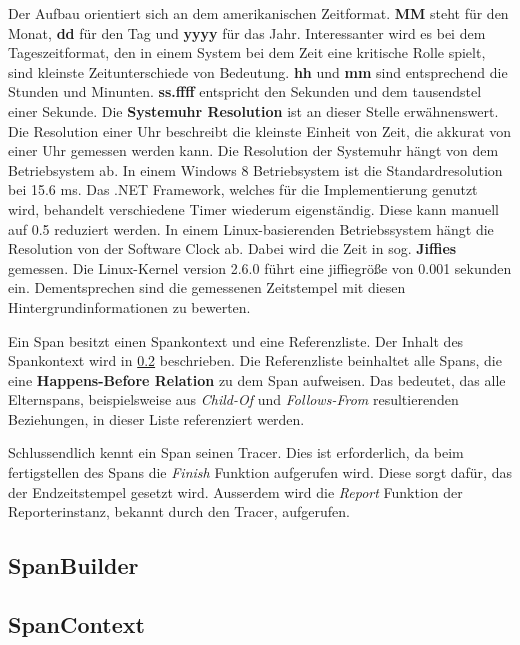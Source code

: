 Der Aufbau orientiert sich an dem amerikanischen Zeitformat. \textbf{MM} steht für den Monat, \textbf{dd} für den Tag und \textbf{yyyy} für das Jahr. Interessanter wird es bei dem Tageszeitformat, den in einem System bei dem Zeit eine kritische Rolle spielt, sind kleinste Zeitunterschiede von Bedeutung. \textbf{hh} und \textbf{mm} sind entsprechend die Stunden und Minunten. \textbf{ss.ffff} entspricht den Sekunden und dem tausendstel einer Sekunde. Die \textbf{Systemuhr Resolution} ist an dieser Stelle erwähnenswert. Die Resolution einer Uhr beschreibt die kleinste Einheit von Zeit, die akkurat von einer Uhr gemessen werden kann. Die Resolution der Systemuhr hängt von dem Betriebsystem ab. In einem Windows 8  Betriebsystem ist die Standardresolution bei 15.6 ms. Das .NET Framework, welches für die Implementierung genutzt wird, behandelt verschiedene Timer wiederum eigenständig. Diese kann manuell auf 0.5 reduziert werden. In einem Linux-basierenden Betriebssystem hängt die Resolution von der Software Clock ab. Dabei wird die Zeit in sog. \textbf{Jiffies} gemessen. Die Linux-Kernel version 2.6.0 führt eine jiffiegröße von 0.001 sekunden ein. Dementsprechen sind die gemessenen Zeitstempel mit diesen Hintergrundinformationen zu bewerten.

Ein Span besitzt einen Spankontext und eine Referenzliste. Der Inhalt des Spankontext wird in \cref{subsection:SpanContext} beschrieben. Die Referenzliste beinhaltet alle Spans, die eine \textbf{Happens-Before Relation} zu dem Span aufweisen. Das bedeutet, das alle Elternspans, beispielsweise aus \emph{Child-Of} und \emph{Follows-From} resultierenden Beziehungen, in dieser Liste referenziert werden.

Schlussendlich kennt ein Span seinen Tracer. Dies ist erforderlich, da beim fertigstellen des Spans die \emph{Finish} Funktion aufgerufen wird. Diese sorgt dafür, das der Endzeitstempel gesetzt wird. Ausserdem wird die \emph{Report} Funktion der Reporterinstanz, bekannt durch den Tracer, aufgerufen.

\subsection{SpanBuilder}
\label{subsection:SpanBuilder}

\subsection{SpanContext}
\label{subsection:SpanContext}

